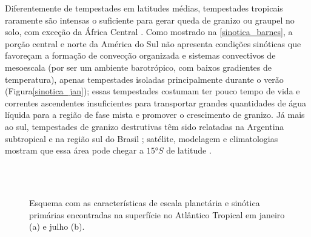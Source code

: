 Diferentemente de tempestades em latitudes médias, tempestades tropicais raramente são intensas o suficiente para gerar queda de granizo ou graupel no solo, com exceção da África Central \cite{Court1982, Hand2011, Cecil2012a}. Como mostrado na \autoref{sinotica_barnes}, a porção central e norte da América do Sul não apresenta condições sinóticas que favoreçam a formação de convecção organizada e sistemas convectivos de mesoescala (por ser um ambiente barotrópico, com baixos gradientes de temperatura), apenas tempestades isoladas principalmente durante o verão (Figura\autoref{sinotica_jan}); essas tempestades costumam ter pouco tempo de vida e correntes ascendentes insuficientes para transportar grandes quantidades de água líquida para a região de fase mista e promover o crescimento de granizo. Já mais ao sul, tempestades de granizo destrutivas têm sido relatadas na Argentina subtropical e na região sul do Brasil \cite{Court1982, Martins2017}; satélite, modelagem e climatologias mostram que essa área pode chegar a $\ang{15}S$ de latitude \cite{Hand2011, Cecil2012a, Albrecht2016}.

\begin{figure}[htb]
	\begin{center}
		\caption{Esquema com as características de escala planetária e sinótica primárias encontradas na superfície no Atlântico Tropical em janeiro (a) e julho (b).} 
		\label{sinotica_barnes}
		 \\
		 \\
	\end{center}
\end{figure}

